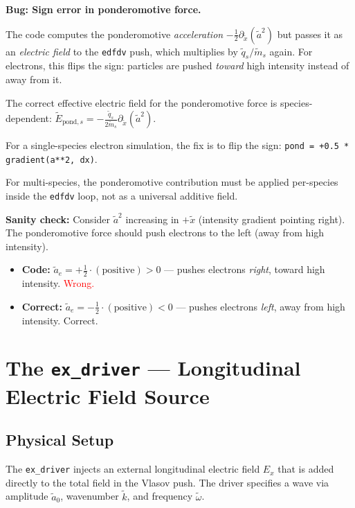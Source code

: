 \documentclass[11pt]{article}
\newcommand{\tl}[1]{\tilde{#1}}
\newcommand{\code}[1]{\texttt{#1}}
\newcommand{\tq}{\tl{q}}
\newcommand{\tm}{\tl{m}}
\begin{document}
\begin{center}
\colorbox{red!15}{\parbox{0.85\textwidth}{
\textbf{Bug: Sign error in ponderomotive force.}

The code computes the ponderomotive \emph{acceleration} $-\frac{1}{2}\partial_{\tl{x}}(\tl{a}^2)$ but passes it as an \emph{electric field} to the \code{edfdv} push, which multiplies by $\tq_s/\tm_s$ again. For electrons, this flips the sign: particles are pushed \emph{toward} high intensity instead of away from it.

The correct effective electric field for the ponderomotive force is species-dependent: $\tl{E}_{\text{pond},s} = -\frac{\tq_s}{2\tm_s}\partial_{\tl{x}}(\tl{a}^2)$.

For a single-species electron simulation, the fix is to flip the sign: \code{pond = +0.5 * gradient(a**2, dx)}.

For multi-species, the ponderomotive contribution must be applied per-species inside the \code{edfdv} loop, not as a universal additive field.
}}
\end{center}

\textbf{Sanity check:} Consider $\tl{a}^2$ increasing in $+\tl{x}$ (intensity gradient pointing right). The ponderomotive force should push electrons to the left (away from high intensity).
\begin{itemize}
    \item \textbf{Code:} $\tl{a}_e = +\frac{1}{2} \cdot (\text{positive}) > 0$ --- pushes electrons \emph{right}, toward high intensity. \textcolor{red}{Wrong.}
    \item \textbf{Correct:} $\tl{a}_e = -\frac{1}{2} \cdot (\text{positive}) < 0$ --- pushes electrons \emph{left}, away from high intensity. \textcolor{green!50!black}{Correct.}
\end{itemize}

\newpage
\section{The \code{ex\_driver} --- Longitudinal Electric Field Source}
\label{sec:ex-driver}

\subsection{Physical Setup}

The \code{ex\_driver} injects an external longitudinal electric field $E_x$ that is added directly to the total field in the Vlasov push. The driver specifies a wave via amplitude $\tl{a}_0$, wavenumber $\tl{k}$, and frequency $\tl{\omega}$.
\end{document}
